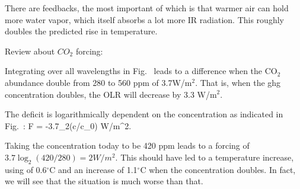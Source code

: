 \documentclass[11pt]{book}
\begin{document}
\item There are feedbacks, the most important of which is that warmer air can hold more water vapor, which itself absorbs a lot more IR radiation. This roughly doubles the predicted rise in temperature.
\eee


Review about $CO_2$ forcing:
\bei
\item Integrating over all wavelengths in Fig.~ leads to a difference when the CO$_2$ abundance double from 280 to 560 ppm of 3.7W/m$^2$. That is, when the ghg concentration doubles, the OLR will decrease by 3.3 W/m$^2$. 
\item The deficit is logarithmically dependent on the concentration as indicated in Fig.~:
\be
\Delta F = -3.7\log_2(c/c_0) W/m^2.\ee 
{}
\item Taking the concentration today to be 420 ppm leads to a forcing of $3.7\log_2(420/280)=2 W/m^2$. This should have led to a temperature increase, using  of 0.6$^\circ$C and an increase of 1.1$^\circ$C when the concentration doubles. In fact, we will see that the situation is much worse than that.
\eei
\end{document}
